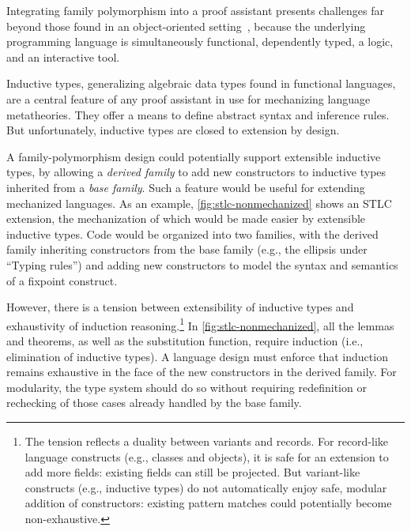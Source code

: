 Integrating family polymorphism into a proof assistant presents challenges
far beyond those found in an object-oriented setting~\cite{ncm2004,vc-calculus-2006,zm2017},
because the underlying programming language is simultaneously
functional, dependently typed, a logic, and an interactive tool.


Inductive types, generalizing algebraic data types found in
functional languages, are a central feature of any proof assistant
in use for mechanizing language metatheories.
They offer a means to define abstract syntax and inference rules.
But unfortunately, inductive types are closed to extension by design.

A family-polymorphism design could potentially support extensible
inductive types, by allowing a \emph{derived family} to add new constructors
to inductive types inherited from a \emph{base family}.
Such a feature would be useful for extending mechanized languages.
As an example, \cref{fig:stlc-nonmechanized} shows an STLC extension,
the mechanization of which would be made easier by extensible inductive types.
Code would be organized into two families, with the
derived family inheriting constructors from the base family (e.g., the
ellipsis under ``Typing rules'') and adding new constructors to model
the syntax and semantics of a fixpoint construct.



However, there is a tension between extensibility of inductive types
and exhaustivity of induction reasoning.\footnote{%
The tension reflects a duality between variants and records.
For record-like language constructs (e.g., classes and objects), it is
safe for an extension to add more fields: existing fields can still be
projected.
But variant-like constructs (e.g., inductive types) do not automatically
enjoy safe, modular addition of constructors:
existing pattern matches could potentially become non-exhaustive.}
In \cref{fig:stlc-nonmechanized}, all the lemmas and theorems, as well as
the substitution function, require induction (i.e., elimination of inductive types).
A language design must enforce that induction remains exhaustive in the
face of the new constructors in the derived family.
For modularity, the type system should do so without requiring
redefinition or rechecking of those cases already handled by the base
family.

